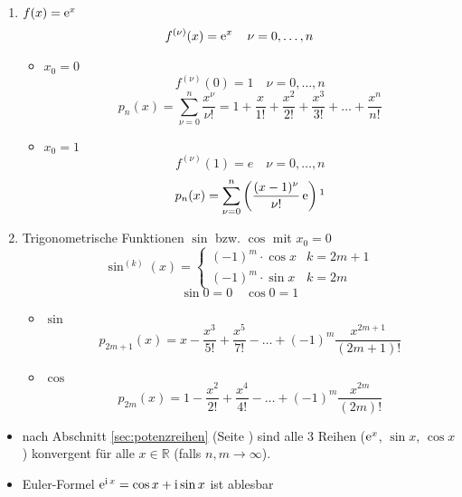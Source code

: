 \begin{example}
  \begin{enumerate}
    \item $f(x) = \operatorname{e}^x$
      \[ f^{(\nu)}(x) = \operatorname{e}^x \quad \nu = 0, \ldots, n \]
      \begin{itemize}
        \item $x_0 = 0$
          \[ f^{(\nu)}(0) = 1 \quad \nu = 0, \ldots, n \]
          \[ p_n(x) = \sum_{\nu = 0}^n \frac{x^\nu}{\nu !} = 1 + \frac x {1!} + \frac{x^2}{2!} + \frac{x^3}{3!} + \ldots + \frac{x^n}{n!} \]
          


        \item $x_0 = 1$
          \[ f^{(\nu)}(1) = e \quad \nu = 0, \ldots, n \]
          \[ p_n(x) = \sum_{\nu = 0}^n \left( \frac{(x-1)^\nu}{\nu !} \euler \right)\annotation{\text{für $x = 1$ und $\nu = 0$ ist der Zähler $(1-1)^0 = 0^0 = 1$}} \]
      \end{itemize}
    \item Trigonometrische Funktionen $\sin$ bzw. $\cos$ mit $x_0 = 0$
      \[ \sin^{(k)}(x) = 
        \begin{cases}
          (-1)^m \cdot \cos x & k = 2m+1 \\
          (-1)^m \cdot \sin x & k = 2m
        \end{cases}
      \]
      \[ \sin 0 = 0 \quad \cos 0 = 1 \]
      \begin{itemize}
        \item $\sin$
          \[ p_{2m+1}(x) = x - \frac{x^3}{5!} + \frac{x^5}{7!} - \ldots + (-1)^m \frac{x^{2m+1}}{(2m+1)!} \]
        \item $\cos$
          \[ p_{2m}(x) = 1 - \frac{x^2}{2!} + \frac{x^4}{4!} - \ldots + (-1)^m \frac{x^{2m}}{(2m)!} \]
      \end{itemize}
  \end{enumerate}
\end{example}

\begin{note}
  \begin{itemize}
    \item nach Abschnitt \ref{sec:potenzreihen} (Seite \pageref{sec:potenzreihen}) sind alle 3 Reihen ($\operatorname{e}^x$, $\sin x$, $\cos x$) konvergent für alle $x \in \mathbb{R}$ (falls $n, m \rightarrow \infty$).
    \item Euler-Formel $\operatorname{e}^{\operatorname{i} x} = \cos x + \operatorname{i} \sin x$ ist ablesbar
  \end{itemize}
\end{note}

